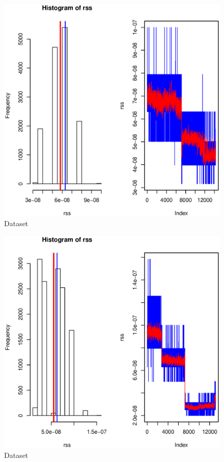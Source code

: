 \documentclass [12 pt , a4paper ] {article}
\begin{document}
\begin{figure}[!ht]
  \centering
  \includegraphics[scale=0.2]{link-14-channel-36.eps}
  \caption{Dataset}
  \label{fig:Dataset}
\end{figure}
\begin{figure}[!ht]
  \centering
  \includegraphics[scale=0.2]{link-14-channel-64.eps}
  \caption{Dataset}
  \label{fig:Dataset}
\end{figure}
\end{document}
